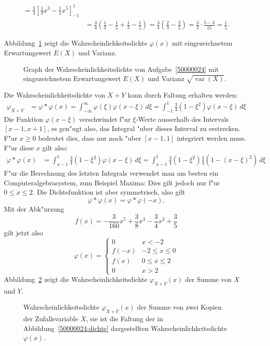 \begin{loesung}
\begin{teilaufgaben}
\begin{align*}
=\frac34\left[\frac13x^3-\frac15x^5\right]_{-1}^1\\
&=\frac34\left(\frac13-\frac15+\frac13-\frac15\right)
=\frac34\left(\frac23-\frac25\right)
=\frac32\cdot\frac{5-3}{15}=\frac15.
\end{align*}
\item 
Abbildung~\ref{50000024:exvarx} zeigt die Wahrscheinlichkeitsdichte $\varphi(x)$
mit eingezeichnetem Erwartungswert $E(X)$ und Varianz.
\begin{figure}
\centering
{}
\caption{Graph der Wahrscheinlichkeitsdichte von Aufgabe~\ref{50000024} mit
eingezeichnetem Erwartungswert $E(X)$ und Varianz $\sqrt{\operatorname{var}(X)}$.
\label{50000024:exvarx}}
\end{figure}
\item
Die Wahrscheinlichkeitsdichte von $X+Y$ kann durch Faltung erhalten werden:
\begin{align*}
\varphi_{X+Y}&=\varphi*\varphi(x)
=\int_{-\infty}^{\infty}\varphi(\xi)\varphi(x-\xi)\,d\xi
=\int_{-1}^1\frac34(1-\xi^2)\varphi(x-\xi)\,d\xi
\end{align*}
Die Funktion $\varphi(x-\xi)$ verschwindet f"ur $\xi$-Werte ausserhalb
des Intervals $[x-1,x+1]$, es gen"ugt also, das Integral "uber dieses
Interval zu erstrecken. F"ur $x\ge 0$ bedeutet dies, dass nur noch
"uber $[x-1,1]$ integriert werden muss. F"ur diese $x$ gilt also:
\begin{align*}
\varphi*\varphi(x)
&=
\int_{x-1}^1 \frac34(1-\xi^2)\varphi(x-\xi)\,d\xi
=
\int_{x-1}^1 \frac34(1-\xi^2)\frac34(1-(x-\xi)^2)\,d\xi
\end{align*}
F"ur die Berechnung des letzten Integrals verwendet man am besten
ein Computeralgebrasystem, zum Beispiel Maxima:
Dies gilt jedoch nur f"ur $0\le x \le 2$. Die Dichtefunktion ist
aber symmetrisch, also gilt
\[
\varphi*\varphi(x)=\varphi*\varphi(-x).
\]
Mit der Abk"urzung
\[
f(x)=-\frac3{160}x^5+\frac38x^3-\frac34x^2+\frac35
\]
gilt jetzt also
\[
\varphi(x)=\begin{cases}
0&x<-2\\
f(-x)&-2\le x\le 0\\
f(x)&0\le x \le 2\\
0&x>2
\end{cases}
\]
Abbildung~\ref{50000024:summe} zeigt die Wahrscheinlichkeitsdichte $\varphi_{X+Y}(x)$
der Summe von $X$ und $Y$.
\begin{figure}
\centering
{}
\caption{Wahrscheinlichkeitsdichte $\varphi_{X+Y}(x)$ der Summe von zwei Kopien
der Zufallsvariable $X$, sie ist die Faltung der in Abbildung~\ref{50000024:dichte}
dargestellten Wahrscheinlichkeitsdichte $\varphi(x)$.
\label{50000024:summe}}
\end{figure}
\end{teilaufgaben}
\end{loesung}


